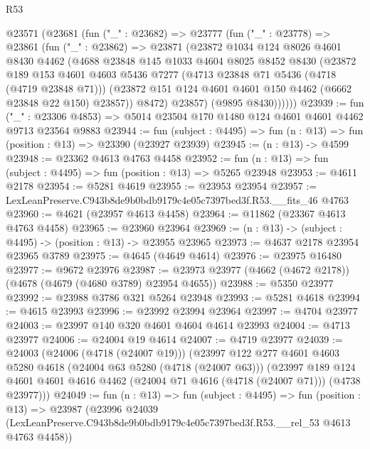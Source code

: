 \begin{lexlean}{R53}
\begin{coremodule}
    @23571
      (@23681
        (fun ("_" : @23682) =>
        @23777
          (fun ("_" : @23778) =>
          @23861
            (fun ("_" : @23862) =>
            @23871
              (@23872
                @1034
                @124
                @8026
                @4601
                @8430
                @4462
                (@4688
                  @23848
                  @145
                  @1033
                  @4604
                  @8025
                  @8452
                  @8430
                  (@23872
                    @189
                    @153
                    @4601
                    @4603
                    @5436
                    @7277
                    (@4713 @23848 @71 @5436 (@4718 (@4719 @23848 @71)))
                    (@23872 @151 @124 @4601 @4601 @150 @4462 (@6662 @23848 @22 @150) @23857))
                  @8472)
                @23857)
              (@9895 @8430))))))
@23939 := fun ("_" : @23306 @4853) =>
  @5014 @23504 @170 @1480 @124 @4601 @4601 @4462 @9713 @23564 @9883
@23944 := fun (subject : @4495) => fun (n : @13) => fun (position : @13) => @23390 (@23927 @23939)
@23945 := (n : @13) -> @4599
@23948 := @23362 @4613 @4763 @4458
@23952 := fun (n : @13) => fun (subject : @4495) => fun (position : @13) => @5265 @23948
@23953 := @4611 @2178
@23954 := @5281 @4619
@23955 := @23953 @23954
@23957 := LexLeanPreserve.C943b8de9b0bdb9179c4e05c7397bed3f.R53.__fits_46 @4763
@23960 := @4621 (@23957 @4613 @4458)
@23964 := @11862 (@23367 @4613 @4763 @4458)
@23965 := @23960 @23964
@23969 := (n : @13) -> (subject : @4495) -> (position : @13) -> @23955 @23965
@23973 := @4637 @2178 @23954 @23965 @3789
@23975 := @4645 (@4649 @4614)
@23976 := @23975 @16480
@23977 := @9672 @23976
@23987 := @23973 @23977 (@4662 (@4672 @2178)) (@4678 (@4679 (@4680 @3789) @23954 @4655))
@23988 := @5350 @23977
@23992 := @23988 @3786 @321 @5264 @23948
@23993 := @5281 @4618
@23994 := @4615 @23993
@23996 := @23992 @23994 @23964
@23997 := @4704 @23977
@24003 := @23997 @140 @320 @4601 @4604 @4614 @23993
@24004 := @4713 @23977
@24006 := @24004 @19 @4614
@24007 := @4719 @23977
@24039 := @24003
    (@24006 (@4718 (@24007 @19)))
    (@23997
      @122
      @277
      @4601
      @4603
      @5280
      @4618
      (@24004 @63 @5280 (@4718 (@24007 @63)))
      (@23997
        @189
        @124
        @4601
        @4601
        @4616
        @4462
        (@24004 @71 @4616 (@4718 (@24007 @71)))
        (@4738 @23977)))
@24049 := fun (n : @13) =>
  fun (subject : @4495) =>
  fun (position : @13) =>
  @23987
    (@23996
      @24039
      (LexLeanPreserve.C943b8de9b0bdb9179c4e05c7397bed3f.R53.__rel_53 @4613 @4763 @4458))

\end{coremodule}
\end{lexlean}
